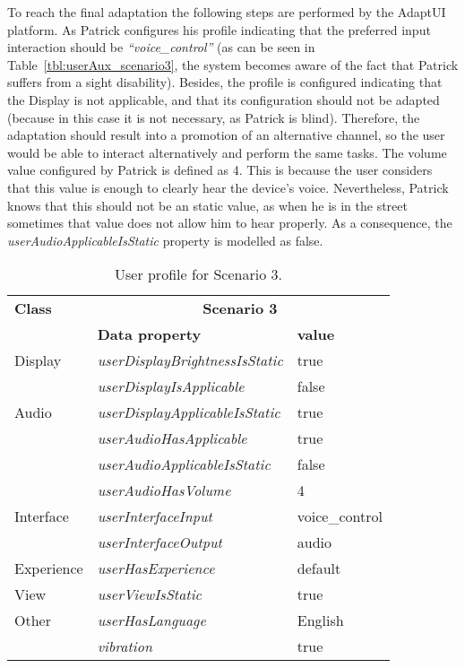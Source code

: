 To reach the final adaptation the following steps are performed by the AdaptUI
platform. As Patrick configures his profile indicating that the preferred input
interaction should be \textit{``voice\_control''} (as can be seen in 
Table~\ref{tbl:userAux_scenario3}, the system becomes aware of the fact that 
Patrick suffers from a sight disability). Besides, the profile is configured 
indicating that the Display is not applicable, and that its configuration 
should not be adapted (because in this case it is not necessary, as Patrick is 
blind). Therefore, the adaptation should result into a promotion of an 
alternative channel, so the user would be able to interact alternatively and 
perform the same tasks. The volume value configured by Patrick is defined as 4. 
This is because the user considers that this value is enough to clearly hear 
the device's voice. Nevertheless, Patrick knows that this should not be an 
static value, as when he is in the street sometimes that value does not allow 
him to hear properly. As a consequence, the \textit{userAudioApplicableIsStatic}
property is modelled as false.

\begin{table}
 \caption{User profile for Scenario 3.}
 \label{tbl:user_profile_scenario3}
 \footnotesize
 \centering
\begin{tabular}{l l l}
  \hline 
  \textbf{Class}		& \multicolumn{2}{c}{\textbf{Scenario 3}}\\
		& \textbf{Data property} & \textbf{value}\\
  \hline
  Display 	& \textit{userDisplayBrightnessIsStatic}& true	\\
		& \textit{userDisplayIsApplicable} 	& false	\\
  Audio 	& \textit{userDisplayApplicableIsStatic}& true	\\
		& \textit{userAudioHasApplicable} 	& true	\\
		& \textit{userAudioApplicableIsStatic} 	& false	\\
		& \textit{userAudioHasVolume}  		& 4 	\\
  Interface 	& \textit{userInterfaceInput}		& voice\_control\\
		& \textit{userInterfaceOutput} 		& audio \\
  Experience	& \textit{userHasExperience} 		& default\\
  View		& \textit{userViewIsStatic}		& true	\\
  Other 	& \textit{userHasLanguage}		& English\\
		& \textit{vibration} 			& true 	\\
  \hline
\end{tabular}
\end{table}

